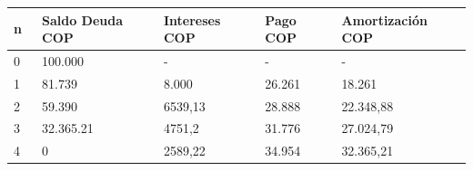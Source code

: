 	      \begin{spacing}{1.1}
	      	\begin{center}
	      		\begin{tabular}{|p{1cm}|p{2cm}|p{2.1cm}|p{2cm}|p{3cm}|}
	      			\hline
	      			\rowcolor{white!50}
	      			\textbf{n\ } & \textbf{Saldo Deuda COP} & \textbf{Intereses  COP} & \textbf{Pago COP} & \textbf{Amortización COP } \\ \hline
	      			
	      			0            &   100.000         &      -       &   -    &        -      \\ \hline
	      			1            &   81.739             &   8.000           &   26.261       &   18.261            \\ \hline
	      			2            &   59.390             &   6539,13              &   28.888       &   22.348,88              \\ \hline
	      			3            &   32.365.21            &   4751,2             &   31.776      &   27.024,79              \\ \hline
	      			4            &   0            &   2589,22            &   34.954       &   32.365,21              \\ \hline
	      		\end{tabular}
	      	\end{center}
	      \end{spacing}


